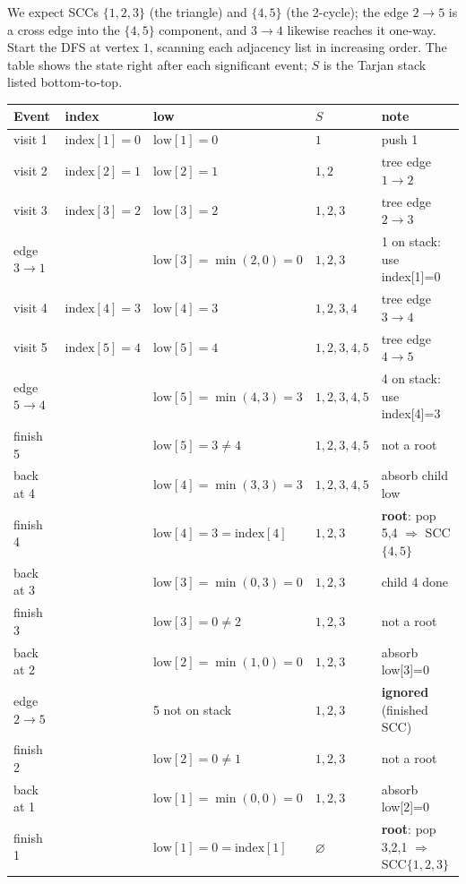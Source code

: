 We expect SCCs $\{1,2,3\}$ (the triangle) and $\{4,5\}$ (the 2-cycle); the edge $2\to 5$ is a cross edge into the $\{4,5\}$ component, and $3\to 4$ likewise reaches it one-way. Start the DFS at vertex $1$, scanning each adjacency list in increasing order. The table shows the state right after each significant event; $S$ is the Tarjan stack listed bottom-to-top.

\begin{center}\small
\begin{longtable}{l l l l l}
\toprule
Event & index & low & $S$ & note \\
\midrule
visit 1 & $\mathrm{index}[1]{=}0$ & $\mathrm{low}[1]{=}0$ & $1$ & push 1 \\
visit 2 & $\mathrm{index}[2]{=}1$ & $\mathrm{low}[2]{=}1$ & $1,2$ & tree edge $1\to2$ \\
visit 3 & $\mathrm{index}[3]{=}2$ & $\mathrm{low}[3]{=}2$ & $1,2,3$ & tree edge $2\to3$ \\
edge $3\to1$ & & $\mathrm{low}[3]{=}\min(2,0){=}0$ & $1,2,3$ & 1 on stack: use index[1]=0 \\
visit 4 & $\mathrm{index}[4]{=}3$ & $\mathrm{low}[4]{=}3$ & $1,2,3,4$ & tree edge $3\to4$ \\
visit 5 & $\mathrm{index}[5]{=}4$ & $\mathrm{low}[5]{=}4$ & $1,2,3,4,5$ & tree edge $4\to5$ \\
edge $5\to4$ & & $\mathrm{low}[5]{=}\min(4,3){=}3$ & $1,2,3,4,5$ & 4 on stack: use index[4]=3 \\
finish 5 & & $\mathrm{low}[5]{=}3\ne 4$ & $1,2,3,4,5$ & not a root \\
back at 4 & & $\mathrm{low}[4]{=}\min(3,3){=}3$ & $1,2,3,4,5$ & absorb child low \\
finish 4 & & $\mathrm{low}[4]{=}3{=}\mathrm{index}[4]$ & $1,2,3$ & \textbf{root}: pop 5,4 $\Rightarrow$ SCC$\{4,5\}$ \\
back at 3 & & $\mathrm{low}[3]{=}\min(0,3){=}0$ & $1,2,3$ & child 4 done \\
finish 3 & & $\mathrm{low}[3]{=}0\ne 2$ & $1,2,3$ & not a root \\
back at 2 & & $\mathrm{low}[2]{=}\min(1,0){=}0$ & $1,2,3$ & absorb low[3]=0 \\
edge $2\to5$ & & 5 not on stack & $1,2,3$ & \textbf{ignored} (finished SCC) \\
finish 2 & & $\mathrm{low}[2]{=}0\ne 1$ & $1,2,3$ & not a root \\
back at 1 & & $\mathrm{low}[1]{=}\min(0,0){=}0$ & $1,2,3$ & absorb low[2]=0 \\
finish 1 & & $\mathrm{low}[1]{=}0{=}\mathrm{index}[1]$ & $\varnothing$ & \textbf{root}: pop 3,2,1 $\Rightarrow$ SCC$\{1,2,3\}$ \\
\bottomrule
\end{longtable}
\end{center}

